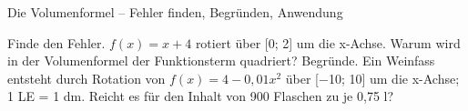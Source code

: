 \begin{aufgabe}{Die Volumenformel – Fehler finden, Begründen, Anwendung}
\begin{teile}
\teil Finde den Fehler. $f(x) = x + 4$ rotiert über [0; 2] um die x-Achse. 
\teil Warum wird in der Volumenformel der Funktionsterm quadriert? Begründe.
\teil Ein Weinfass entsteht durch Rotation von $f(x) = 4 - 0{,}01x^2$ über [−10; 10] um die x-Achse; 1 LE = 1 dm. Reicht es für den Inhalt von 900 Flaschen zu je 0,75 l? \janein
\end{teile}
\end{aufgabe}
